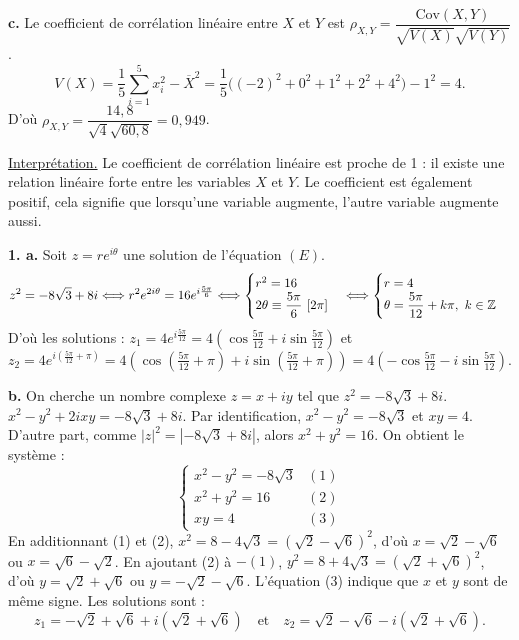 \documentclass[11pt]{article}
\begin{document}
\textbf{c.} Le coefficient de corrélation linéaire entre $X$ et $Y$ est $\rho_{X,Y} = \dfrac{\mathrm{Cov}(X, Y)}{\sqrt{V(X)}\sqrt{V(Y)}}$.
\[ V(X) = \frac{1}{5}\sum_{i=1}^5 x_i^2 - \overline{X}^2 = \frac{1}{5}\big((-2)^2 + 0^2 + 1^2 + 2^2 + 4^2\big) - 1^2 = 4. \]
D'où $\rho_{X,Y} = \dfrac{14{,}8}{\sqrt{4}\sqrt{60{,}8}} = 0{,}949$.

\underline{Interprétation.} Le coefficient de corrélation linéaire est proche de 1 : il existe une relation linéaire forte entre les variables $X$ et $Y$. Le coefficient est également positif, cela signifie que lorsqu'une variable augmente, l'autre variable augmente aussi.


\textbf{1. a.} Soit $z = re^{i\theta}$ une solution de l'équation $(E)$.
\[ z^2 = -8\sqrt{3} + 8i \Longleftrightarrow r^2 e^{2i\theta} = 16e^{i\frac{5\pi}{6}} \Longleftrightarrow \begin{cases} r^2 = 16 \\ 2\theta \equiv \dfrac{5\pi}{6}\ [2\pi] \end{cases} \Longleftrightarrow \begin{cases} r = 4 \\ \theta = \dfrac{5\pi}{12} + k\pi,\ k \in \mathbb{Z} \end{cases} \]
D'où les solutions : $z_1 = 4e^{i\frac{5\pi}{12}} = 4\left(\cos\tfrac{5\pi}{12} + i\sin\tfrac{5\pi}{12}\right)$ et $z_2 = 4e^{i\left(\frac{5\pi}{12} + \pi\right)} = 4\left(\cos\left(\tfrac{5\pi}{12} + \pi\right) + i\sin\left(\tfrac{5\pi}{12} + \pi\right)\right) = 4\left(-\cos\tfrac{5\pi}{12} - i\sin\tfrac{5\pi}{12}\right)$.

\textbf{b.} On cherche un nombre complexe $z = x + iy$ tel que $z^2 = -8\sqrt{3} + 8i$. $x^2 - y^2 + 2ixy = -8\sqrt{3} + 8i$. Par identification, $x^2 - y^2 = -8\sqrt{3}$ et $xy = 4$. D'autre part, comme $|z|^2 = |-8\sqrt{3} + 8i|$, alors $x^2 + y^2 = 16$. On obtient le système :
\[ \begin{cases} x^2 - y^2 = -8\sqrt{3} & (1) \\ x^2 + y^2 = 16 & (2) \\ xy = 4 & (3) \end{cases} \]
En additionnant (1) et (2), $x^2 = 8 - 4\sqrt{3} = (\sqrt{2} - \sqrt{6})^2$, d'où $x = \sqrt{2} - \sqrt{6}$ ou $x = \sqrt{6} - \sqrt{2}$. En ajoutant (2) à $-(1)$, $y^2 = 8 + 4\sqrt{3} = (\sqrt{2} + \sqrt{6})^2$, d'où $y = \sqrt{2} + \sqrt{6}$ ou $y = -\sqrt{2} - \sqrt{6}$. L'équation (3) indique que $x$ et $y$ sont de même signe. Les solutions sont :
\[ z_1 = -\sqrt{2} + \sqrt{6} + i(\sqrt{2} + \sqrt{6}) \quad \text{et} \quad z_2 = \sqrt{2} - \sqrt{6} - i(\sqrt{2} + \sqrt{6}). \]
\end{document}
